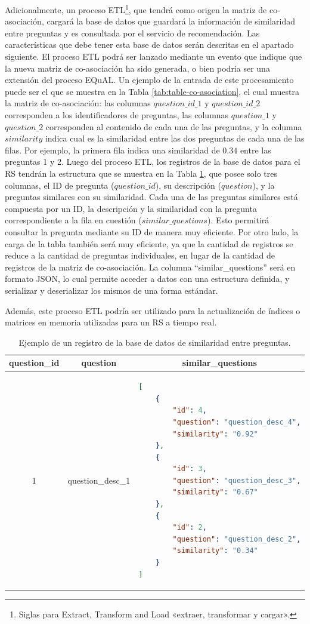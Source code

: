 Adicionalmente, un proceso ETL\footnote{Siglas para Extract, Transform and Load «extraer, transformar y cargar».}, que tendrá como origen la matriz de co-asociación, cargará la base de datos que guardará la información de similaridad entre preguntas y es consultada por el servicio de recomendación. Las características que debe tener esta base de datos serán descritas en el apartado siguiente. El proceso ETL podrá ser lanzado mediante un evento que indique que la nueva matriz de co-asociación ha sido generada, o bien podría ser una extensión del proceso EQuAL. Un ejemplo de la entrada de este procesamiento puede ser el que se muestra en la Tabla \ref{tab:table-co-asociation}, el cual muestra la matriz de co-asociación: las columnas \(question\_id\_1\) y \(question\_id\_2\) corresponden a los identificadores de preguntas, las columnas \(question\_1\) y \(question\_2\) corresponden al contenido de cada una de las preguntas, y la columna \(similarity\) indica cual es la similaridad entre las dos preguntas de cada una de las filas. Por ejemplo, la primera fila indica una similaridad de \(0.34\) entre las preguntas 1 y 2. Luego del proceso ETL, los registros de la base de datos para el RS tendrán la estructura que se muestra en la Tabla \ref{tab:table-similar-questions}, que posee solo tres columnas, el ID de pregunta (\(question\_id\)), su descripción (\(question\)), y la preguntas similares con su similaridad. Cada una de las preguntas similares está compuesta por un ID, la descripción y la similaridad con la pregunta correspondiente a la fila en cuestión (\(similar\_questions\)). Esto permitirá consultar la pregunta mediante su ID de manera muy eficiente. Por otro lado, la carga de la tabla también será muy eficiente, ya que la cantidad de registros se reduce a la cantidad de preguntas individuales, en lugar de la cantidad de registros de la matriz de co-asociación. La columna “similar\_questions” será en formato JSON, lo cual permite acceder a datos con una estructura definida, y serializar y deserializar los mismos de una forma estándar.

\bigskip Además, este proceso ETL podría ser utilizado para la actualización de índices o matrices en memoria utilizadas para un RS a tiempo real.

\begin{table}[h!]
	\centering
	\footnotesize
	\caption{Ejemplo de un registro de la base de datos de similaridad entre preguntas.}
	\begin{tabular}{|c|c|l|}
		\hline
		\textbf{question\_id} &
		\textbf{question} &
		\multicolumn{1}{c|}{\textbf{similar\_questions}} \\ \hline
		1 & question\_desc\_1 & \begin{lstlisting}[language=json]
[
	{
		"id": 4,
		"question": "question_desc_4",
		"similarity": "0.92"
	},
	{
		"id": 3,
		"question": "question_desc_3",
		"similarity": "0.67"
	},
	{
		"id": 2,
		"question": "question_desc_2",
		"similarity": "0.34"
	}
]
		\end{lstlisting} \\ \hline
	\end{tabular}
	\label{tab:table-similar-questions}
\end{table}

